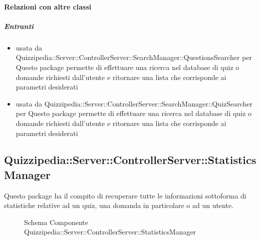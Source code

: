 \paragraph{Relazioni con altre classi}
\subparagraph{Entranti}
\begin{itemize}
\item usata da Quizzipedia::Server::ControllerServer::SearchManager::QuestionsSearcher per Questo package permette di effettuare una ricerca nel database di quiz o domande richiesti dall'utente e ritornare una lista che corrisponde ai parametri desiderati
\item usata da Quizzipedia::Server::ControllerServer::SearchManager::QuizSearcher per Questo package permette di effettuare una ricerca nel database di quiz o domande richiesti dall'utente e ritornare una lista che corrisponde ai parametri desiderati
\end{itemize}
\subsection{Quizzipedia::Server::ControllerServer::StatisticsManager}
Questo package ha il compito di recuperare tutte le informazioni sottoforma di statistiche relative ad un quiz, una domanda in particolare o ad un utente.
\begin{figure}[H]
\centering
\noindent{}
\caption[Schema Componente Quizzipedia::Server::ControllerServer::StatisticsManager]{Schema Componente Quizzipedia::Server::ControllerServer::StatisticsManager}
\end{figure}
